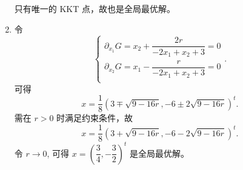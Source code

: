 \begin{Problem}
\begin{enumerate}
        只有唯一的 KKT 点，故也是全局最优解。
        \item 令 
        \[\begin{cases}
            \partial_{x_1}G = x_2 + \dfrac{2r}{-2x_1 + x_2 + 3} = 0\\
            \partial_{x_2}G = x_1 - \dfrac{r}{-2x_1 + x_2 + 3} = 0\\
        \end{cases}.\] 可得 \[x = \frac{1}{8}(3 \mp \sqrt{9 - 16r}, -6 \pm 2\sqrt{9 - 16r})^t.\] 
        需在 $r > 0$ 时满足约束条件，故 
        \[x = \frac{1}{8}(3 + \sqrt{9 - 16r}, -6 - 2\sqrt{9 - 16r})^t.\] 
        令 $r \to 0$, 可得 $x = \left(\dfrac{3}{4}, -\dfrac{3}{2}\right)^t$ 是全局最优解。
    \end{enumerate}
\end{Problem}

